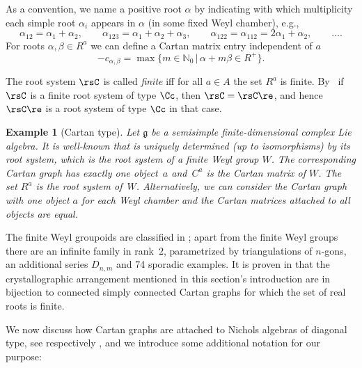\documentclass[pdftex]{sigma}%
\numberwithin{equation}{section}
\newtheorem{ese}[teo]{Example}
\newcommand{\N}{\mathbb{N}}
\newcommand{\g}{\mathfrak{g}}
\begin{document}
As a convention, we name a positive root $\alpha$ by indicating with which multiplicity each simple root $\alpha_i$ appears in $\alpha$ (in some fixed Weyl chamber), e.g.,
\[\alpha_{12}=\alpha_1+\alpha_2,\qquad
\alpha_{123}=\alpha_1+\alpha_2+\alpha_3,\qquad
\alpha_{12 2}=\alpha_{112}=2\alpha_1+\alpha_2, \qquad \dots.\]
For roots $\alpha,\beta\in R^a$ we can define a Cartan matrix entry independent of $a$
 \[-c_{\alpha,\beta}=\max \{m\in\N_0\,|\,\alpha+m\beta \in R^+\}.\]

The root system $\rsC $ is called \textit{finite} iff for all $a\in A$ the
set $R^a$ is finite. By~\cite{CH09} if $\rsC $ is a finite root system
of type $\Cc $, then $\rsC =\rsC \re $, and hence $\rsC \re $ is a root
system of type $\Cc$ in that case.

\begin{ese}[Cartan type]Let $\g$ be a semisimple finite-dimensional complex Lie algebra. It is well-known that is uniquely determined (up to isomorphisms) by its root system, which is the root system of a finite Weyl group $W$. The corresponding Cartan graph has exactly one object~$a$ and~$C^a$ is the Cartan matrix of $W$. The set $R^a$ is the root system of~$W$. Alternatively, we can consider the Cartan graph with one object $a$ for each Weyl chamber and the Cartan matrices attached to all objects are equal.
\end{ese}

 The finite Weyl groupoids are classified in \cite{CH09, CH10}; apart from the finite Weyl groups there are an infinite family in rank~$2$, parametrized by triangulations of $n$-gons, an additional series $D_{n,m}$ and 74 sporadic examples.
 It is proven in \cite[Theorem~1.1]{Cun10} that the crystallographic arrangement mentioned in this section's introduction are in bijection to connected simply connected Cartan graphs for which the set of real roots is finite.

We now discuss how Cartan graphs are attached to Nichols algebras of diagonal type, see \cite[Section~3.3]{Heck07} respectively \cite[Chapter~15]{HS20}, and we introduce some additional notation for our purpose:
\end{document}

